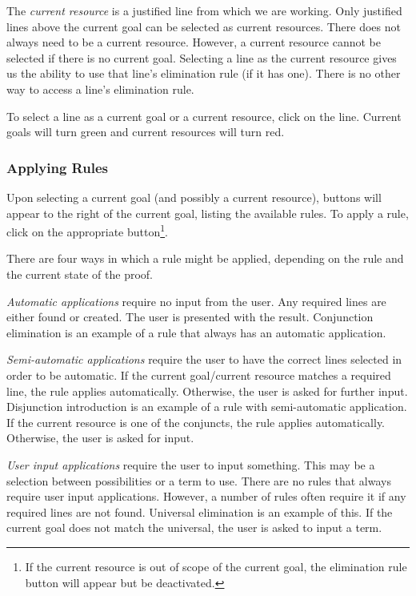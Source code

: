 \documentclass[a4paper]{article}
\begin{document}
The \emph{current resource} is a justified line from which we are working. Only justified lines above the current goal can be selected as current resources. There does not always need to be a current resource. However, a current resource cannot be selected if there is no current goal. Selecting a line as the current resource gives us the ability to use that line's elimination rule (if it has one). There is no other way to access a line's elimination rule.

To select a line as a current goal or a current resource, click on the line. Current goals will turn green and current resources will turn red.


\subsubsection{Applying Rules}
Upon selecting a current goal (and possibly a current resource), buttons will appear to the right of the current goal, listing the available rules. To apply a rule, click on the appropriate button\footnote{If the current resource is out of scope of the current goal, the elimination rule button will appear but be deactivated.}.

There are four ways in which a rule might be applied, depending on the rule and the current state of the proof.

\emph{Automatic applications} require no input from the user. Any required lines are either found or created. The user is presented with the result. Conjunction elimination is an example of a rule that always has an automatic application.

\emph{Semi-automatic applications} require the user to have the correct lines selected in order to be automatic. If the current goal/current resource matches a required line, the rule applies automatically. Otherwise, the user is asked for further input. Disjunction introduction is an example of a rule with semi-automatic application. If the current resource is one of the conjuncts, the rule applies automatically. Otherwise, the user is asked for input.

\emph{User input applications} require the user to input something. This may be a selection between possibilities or a term to use. There are no rules that always require user input applications. However, a number of rules often require it if any required lines are not found. Universal elimination is an example of this. If the current goal does not match the universal, the user is asked to input a term.
\end{document}

